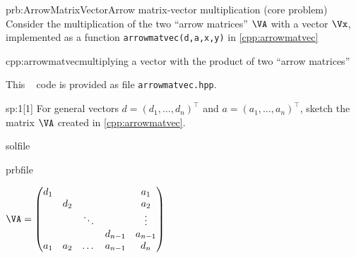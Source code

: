 
\begin{samproblem}{prb:ArrowMatrixVector}{Arrow matrix-vector multiplication (core problem)}{
Consider the multiplication of the two ``arrow matrices'' $\VA$ with a vector $\Vx$,
implemented as a function \texttt{arrowmatvec(d,a,x,y)} in \cref{cpp:arrowmatvec}
}
\begin{samcode}[C++-code]{cpp:arrowmatvec}{multiplying a vector with the product of two ``arrow matrices''}
  
\end{samcode}

\begin{samhint}
This \cpp~ code is provided as file \texttt{arrowmatvec.hpp}.
\end{samhint}


\begin{subproblem}{sp:1}[1]
  For general vectors $d = (d_1, \dots, d_n)^\top$ and $a = (a_1, \dots, a_n)^\top$, sketch the matrix $\VA$ created in \autoref{cpp:arrowmatvec}.

  \begin{samwriteprbpart}{solfile}
    \begin{writeverbatim}{prbfile}
      \begin{samsolution}
        $\VA=\begin{pmatrix}
         d_1 &     &        &         &  a_1     \\
             & d_2 &        &         &  a_2     \\
             &     & \ddots &         &  \vdots  \\
             &     &        & d_{n-1} &  a_{n-1} \\
         a_1 & a_2 & \dots  & a_{n-1} &  d_n     \\
        \end{pmatrix}$
      \end{samsolution}
    \end{writeverbatim}
  \end{samwriteprbpart}
\end{subproblem}


\end{samproblem}
